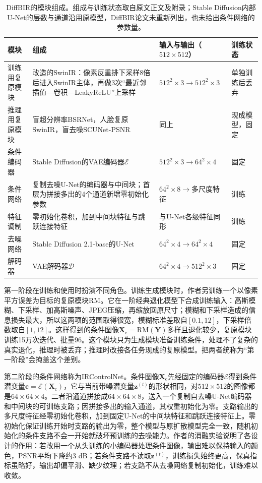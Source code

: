 \begin{table}[tbp]
 \centering
 \small
 \begin{tabularx}{\linewidth}{@{}p{24mm}Xp{34mm}p{18mm}@{}}
  \toprule
  模块 & 组成 & 输入与输出（$512\times512$） & 训练状态\\
  \midrule
  训练用复原模块 & 改造的SwinIR：像素反重排下采样8倍后进入SwinIR主体，再做3次“最近邻插值—卷积—LeakyReLU”上采样 & $512^2\times3\to512^2\times3$ & 单独训练后丢弃\\
  推理用复原模块 & 盲超分辨率BSRNet，人脸复原SwinIR，盲去噪SCUNet-PSNR & 同上 & 现成模型，固定\\
  条件编码器 & Stable Diffusion的VAE编码器$\mathcal{E}$ & $512^2\times3\to64^2\times4$ & 固定\\
  条件网络 & 复制去噪U-Net的编码器与中间块；首层为拼接多出的4个通道新增零初始化参数 & $64^2\times8\to$多尺度特征 & 训练\\
  特征调制 & 零初始化卷积，加到中间块特征与跳跃连接特征 & 与U-Net各级特征同形 & 训练\\
  去噪网络 & Stable Diffusion 2.1-base的U-Net & $64^2\times4\to64^2\times4$ & 固定\\
  解码器 & VAE解码器$\mathcal{D}$ & $64^2\times4\to512^2\times3$ & 固定\\
  \bottomrule
 \end{tabularx}
 \caption{DiffBIR的模块组成。组成与训练状态取自原文正文及附录；Stable Diffusion内部U-Net的层数与通道沿用原模型，DiffBIR论文未重新列出，也未给出条件网络的参数量。}
 \label{tab:vision-diffbir-modules}
\end{table}

第一阶段在训练和使用时扮演不同角色。训练生成模块时，作者另训练一个以像素平方误差为目标的复原模块$\mathrm{RM}$。它在一阶经典退化模型下合成训练输入：高斯模糊、下采样、加高斯噪声、JPEG压缩，再缩放回原尺寸；模糊和下采样造成的信息损失最大，所以这两项的范围取得很宽，模糊标准差取自$[0.1,12]$，下采样倍数取自$[1,12]$。这样得到的条件图像$\bm{X}_{\mathrm{c}}=\mathrm{RM}(\bm{Y})$多样且退化较少，复原模块训练15万次迭代、批量96。这个模块只为生成模块准备训练条件，处理不了复杂的真实退化，推理时被丢弃；推理时改接各任务现成的复原模型。把两者统称为“第一阶段”会掩盖这个差别。

第二阶段的条件网络称为IRControlNet。条件图像$\bm{X}_{\mathrm{c}}$先经固定的编码器$\mathcal{E}$得到条件潜变量$\bm{c}=\mathcal{E}(\bm{X}_{\mathrm{c}})$，它与当前带噪潜变量$\bm{z}^{(t)}$的形状相同，对$512\times512$的图像都是$64\times64\times4$。二者沿通道拼接成$64\times64\times8$，送入一个复制自去噪U-Net编码器和中间块的可训练支路；因拼接多出的输入通道，其权重初始化为零。支路输出的多尺度特征经零初始化卷积，加到固定U-Net的中间块特征和跳跃连接特征上。零初始化保证训练开始时支路的输出为零，整个模型与原扩散模型完全一致，随机初始化的条件支路不会一开始就破坏预训练的去噪能力。作者的消融实验说明了各设计的作用：若改用一个从头训练的小编码器处理条件图像，输出难以保持输入的颜色，PSNR平均下降约3 dB；若条件支路不读取$\bm{z}^{(t)}$，训练损失始终更高，保真指标虽略好，输出却偏平滑、缺少纹理；若支路不从去噪网络复制初始化，训练难以收敛。

